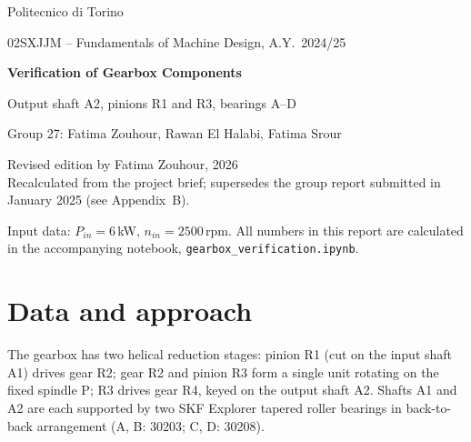 \documentclass[11pt,a4paper]{article}
\begin{document}
\begin{titlepage}
\centering
\vspace*{3cm}
{\Large Politecnico di Torino\par}
{\large 02SXJJM -- Fundamentals of Machine Design, A.Y.~2024/25\par}
\vspace{2.5cm}
{\huge\bfseries Verification of Gearbox Components\par}
\vspace{0.6cm}
{\Large Output shaft A2, pinions R1 and R3, bearings A--D\par}
\vspace{2.5cm}
{\large Group 27: Fatima Zouhour, Rawan El Halabi, Fatima Srour\par}
\vspace{1.2cm}
{\normalsize Revised edition by Fatima Zouhour, 2026\\[2pt]
\color{black!60}Recalculated from the project brief; supersedes the group report submitted in January 2025 (see Appendix~B).\par}
\vfill
{\small Input data: $P_{in}=6$\,kW, $n_{in}=2500$\,rpm. All numbers in this report are calculated in the accompanying notebook, \texttt{gearbox\_verification.ipynb}.\par}
\end{titlepage}

\tableofcontents
\newpage

\section{Data and approach}
The gearbox has two helical reduction stages: pinion R1 (cut on the input shaft A1) drives gear R2; gear R2 and pinion R3 form a single unit rotating on the fixed spindle P; R3 drives gear R4, keyed on the output shaft A2. Shafts A1 and A2 are each supported by two SKF Explorer tapered roller bearings in back-to-back arrangement (A, B: 30203; C, D: 30208).
\end{document}
